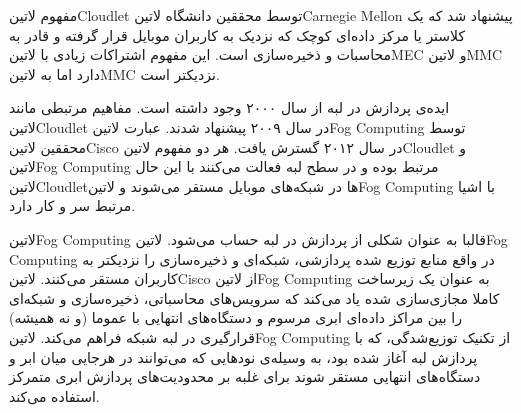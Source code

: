 
مفهوم ‌لاتین{Cloudlet} توسط محققین دانشگاه ‌لاتین{Carnegie Mellon} پیشنهاد شد که یک کلاستر یا مرکز داده‌ای کوچک
که نزدیک به کاربران موبایل قرار گرفته و قادر به محاسبات و ذخیره‌سازی است.
این مفهوم اشتراکات زیادی با ‌لاتین{MEC} و ‌لاتین{MMC} دارد اما به ‌لاتین{MMC} نزدیکتر است.


ایده‌ی پردازش در لبه از سال ۲۰۰۰ وجود داشته است. مفاهیم مرتبطی مانند ‌لاتین{Cloudlet} در سال ۲۰۰۹ پیشنهاد شدند.
عبارت ‌لاتین{Fog Computing} توسط محققین ‌لاتین{Cisco} در سال ۲۰۱۲ گسترش یافت.
هر دو مفهوم ‌لاتین{Cloudlet} و ‌لاتین{Fog Computing} مرتبط بوده و در سطح لبه فعالت می‌کنند با این حال
‌لاتین{Cloudlet}ها در شبکه‌های موبایل مستقر می‌شوند و ‌لاتین{Fog Computing} با اشیا مرتبط سر و کار دارد.

‌لاتین{Fog Computing} قالبا به عنوان شکلی از پردازش در لبه حساب می‌شود.
‌لاتین{Fog Computing} در واقع منابع توزیع شده پردازشی، شبکه‌ای و ذخیره‌سازی را نزدیکتر به کاربران مستقر می‌کنند.
‌لاتین{Cisco} از ‌لاتین{Fog Computing} به عنوان یک زیرساخت کاملا مجازی‌سازی شده یاد می‌کند که سرویس‌های محاسباتی، ذخیره‌سازی و شبکه‌ای
را بین مراکز داده‌ای ابری مرسوم و دستگاه‌های انتهایی با عموما (و نه همیشه) قرارگیری در لبه شبکه فراهم می‌کند.
‌لاتین{Fog Computing} از تکنیک توزیع‌شدگی، که با پردازش لبه آغاز شده بود، به وسیله‌ی نودهایی که
می‌توانند در هرجایی میان ابر و دستگاه‌های انتهایی مستقر شوند
برای غلبه بر محدودیت‌های پردازش ابری متمرکز استفاده می‌کند.


